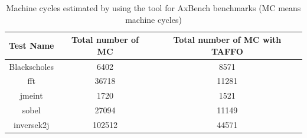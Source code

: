 \begin{table}[ht]
\begin{center}
\caption{Machine cycles estimated by using the tool for AxBench benchmarks (MC means machine cycles)}
\vspace{0.5cm}
\begin{tabular}{ |c|c|c| } 
 \hline
Test Name & Total number of MC & Total number of MC with TAFFO \\
 \hline
  Blackscholes & 6402 & 8571 \\
 \hline
  fft & 36718 & 11281 \\
 \hline
  jmeint & 1720 & 1521 \\
 \hline
  sobel & 27094 & 11149 \\
 \hline
  inversek2j & 102512 & 44571 \\
 \hline
 \end{tabular}
\end{center}
\end{table}

